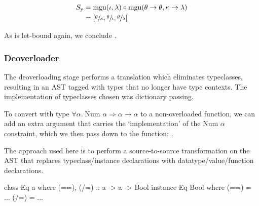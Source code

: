 \documentclass[dissertation.tex]{subfiles}
\begin{document}
{{{\begin{figure}[H]
            \begin{subfigure}[c]{\textwidth}
                \centering
                \begin{equation*}
                \begin{split}
                    S_\text{y} & = \text{mgu}(\iota, \lambda) \circ \text{mgu}(\theta\rightarrow\theta, \kappa\rightarrow\lambda) \\
                               & = [\sfrac{\theta}{\kappa}, \sfrac{\theta}{\iota}, \sfrac{\theta}{\lambda}]
                \end{split}
                \end{equation*}
            \end{subfigure}
            \end{figure}

            As  is let-bound again, we conclude .

        }


        \subsubsection{Deoverloader}
        {

            The deoverloading stage performs a translation which eliminates typeclasses, resulting in an AST tagged with
            types that no longer have type contexts. The implementation of typeclasses chosen was dictionary passing.

            To convert  with type \(\forall \alpha.\; \text{Num }\alpha \Rightarrow
            \alpha\rightarrow\alpha\) to a non-overloaded function, we can add an extra argument that carries the
            `implementation' of the \(\text{Num }\alpha\) constraint, which we then pass down to the \haskell{+}
            function: .


            The approach used here is to perform a source-to-source transformation on the AST that replaces
            typeclass/instance declarations with datatype/value/function declarations.

            \begin{haskellfigure}
            class Eq a where
                (==), (/=) :: a -> a -> Bool
            instance Eq Bool where
                (==) = ...
                (/=) = ...
            \end{haskellfigure}

}}}
\end{document}
